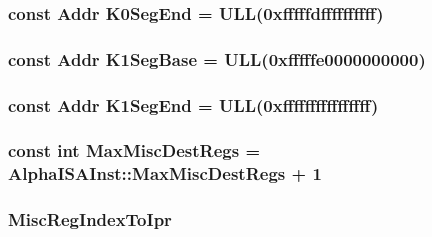 \label{namespaceAlphaISA_addb273bca2a259dc76f478f53b61ff11}
\hypertarget{namespaceAlphaISA_acc102ef1fcdb799119ec7b33af4198f0}{
\subsubsection[{K0SegEnd}]{\setlength{\rightskip}{0pt plus 5cm}const {\bf Addr} {\bf K0SegEnd} = ULL(0xfffffdffffffffff)}}
\label{namespaceAlphaISA_acc102ef1fcdb799119ec7b33af4198f0}
\hypertarget{namespaceAlphaISA_af3e520006557877e41eafa56b43b35b8}{
\subsubsection[{K1SegBase}]{\setlength{\rightskip}{0pt plus 5cm}const {\bf Addr} {\bf K1SegBase} = ULL(0xfffffe0000000000)}}
\label{namespaceAlphaISA_af3e520006557877e41eafa56b43b35b8}
\hypertarget{namespaceAlphaISA_a1c845959a4414a849c86e1064d650fc7}{
\subsubsection[{K1SegEnd}]{\setlength{\rightskip}{0pt plus 5cm}const {\bf Addr} {\bf K1SegEnd} = ULL(0xffffffffffffffff)}}
\label{namespaceAlphaISA_a1c845959a4414a849c86e1064d650fc7}
\hypertarget{namespaceAlphaISA_a47db6c8581feb5d9094784b480156f0b}{
\subsubsection[{MaxMiscDestRegs}]{\setlength{\rightskip}{0pt plus 5cm}const int {\bf MaxMiscDestRegs} = AlphaISAInst::MaxMiscDestRegs + 1}}
\label{namespaceAlphaISA_a47db6c8581feb5d9094784b480156f0b}
\hypertarget{namespaceAlphaISA_a85596e9220b88ac7b8d5045e67e0c8d9}{
\subsubsection[{MiscRegIndexToIpr}]{ {\bf MiscRegIndexToIpr}}}
